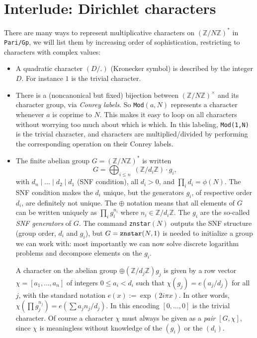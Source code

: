 \documentclass[11pt]{article}
\newcommand{\Z}{{\mathbb Z}}
\def\kbd#1{{\tt #1}}
\begin{document}
\section{Interlude: Dirichlet characters}

There are many ways to represent multiplicative characters on $(\Z/N\Z)^*$ in
\kbd{Pari/Gp}, we will list them by increasing order of sophistication,
restricting to characters with complex values:

\begin{itemize}

\item A quadratic character $(D/.)$ (Kronecker symbol) is described by
the integer $D$. For instance $1$ is the trivial character.

\item There is a (noncanonical but fixed) bijection between $(\Z/N\Z)^\times$
and its character group, via \emph{Conrey labels}. So \kbd{Mod}$(a,N)$
represents a character whenever $a$ is coprime to $N$. This makes it easy
to loop on all characters without worrying too much about which is which.
In this labeling, \kbd{Mod(1,N)} is the trivial character, and characters
are multiplied/divided by performing the corresponding operation on their
Conrey labels.

\item The finite abelian group $G = (\Z/N\Z)^*$ is written
$$G = \bigoplus_{i\leq n}\; (\Z/d_i\Z) \cdot g_i,$$
with $d_n \mid \dots \mid d_2 \mid d_1$ (SNF condition), all $d_i > 0$, and
$\prod_i d_i = \phi(N)$. The SNF condition makes the $d_i$ unique, but the
generators $g_i$, of respective order $d_i$, are definitely not unique. The
$\oplus$ notation means that all elements of $G$ can be written uniquely as
$\prod_i g_i^{n_i}$ where $n_i \in \Z/d_i\Z$. The $g_i$ are the so-called
\emph{SNF generators} of $G$. The command \kbd{znstar}$(N)$ outputs the SNF
structure (group order, $d_i$ and  $g_i$), but $G = \kbd{znstar}(N, 1)$ is
needed to initialize a group we can work with: most importantly we can now
solve discrete logarithm problems and decompose elements on the $g_i$.

A character on the abelian group $\oplus (\Z/d_j\Z) g_j$ is given by a row
vector $\chi = [a_1,\ldots,a_n]$ of integers $0\leq a_i  < d_i$ such that
$\chi(g_j) = e(a_j / d_j)$ for all $j$, with the standard notation $e(x) :=
\exp(2i\pi x)$. In other words, $\chi(\prod g_j^{n_j}) = e(\sum a_j n_j /
d_j)$. In this encoding $[0,\dots,0]$ is the trivial character. Of course
a character $\chi$ must always be given as a \emph{pair} $[G,\chi]$,
since $\chi$ is meaningless without knowledge of the $(g_i)$ or the $(d_i)$.
\end{itemize}
\end{document}
